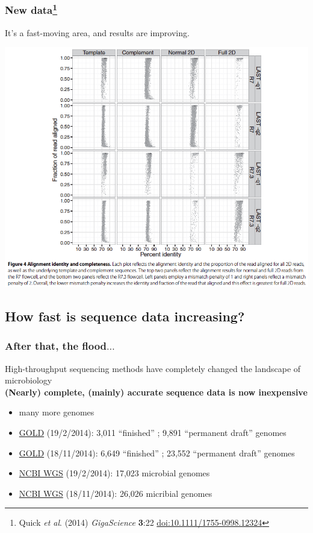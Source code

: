 \begin{frame}
  \frametitle{New data\footnote{\tiny{Quick \textit{et al}. (2014) \textit{GigaScience} \textbf{3}:22 \href{http://dx.doi.org/10.1111/1755-0998.12324}{doi:10.1111/1755-0998.12324}}}}
  It's a fast-moving area, and results are improving.
    \begin{center}
      \includegraphics[height=0.65\textheight]{images/nanopore_quick}
    \end{center}           
\end{frame}

\subsection{How fast is sequence data increasing?}

\begin{frame}
  \frametitle{After that, the flood$\ldots$}
  High-throughput sequencing methods have completely changed the landscape of microbiology \\
  \textbf{(Nearly) complete, (mainly) accurate sequence data is now inexpensive}
  \begin{itemize}
    \item many more genomes
    \item \href{http://www.genomesonline.org/cgi-bin/GOLD/index.cgi?page_requested=Complete+Genome+Projects&subset_requested=Complete+And+Published}{GOLD} (19/2/2014): 3,011 ``finished'' ; 9,891 ``permanent draft'' genomes
    \item \href{http://www.genomesonline.org/cgi-bin/GOLD/index.cgi?page_requested=Complete+Genome+Projects&subset_requested=Complete+And+Published}{GOLD} (18/11/2014): 6,649 ``finished'' ; 23,552 ``permanent draft'' genomes    
    \item \href{http://www.ncbi.nlm.nih.gov/Traces/wgs/}{NCBI WGS} (19/2/2014): 17,023 microbial genomes
    \item \href{http://www.ncbi.nlm.nih.gov/Traces/wgs/}{NCBI WGS} (18/11/2014): 26,026 micribial genomes
  \end{itemize}
\end{frame}

